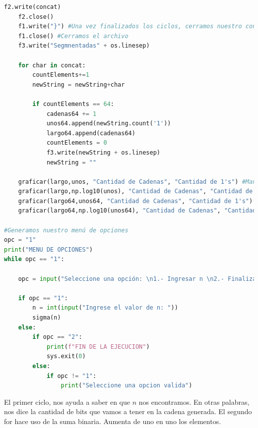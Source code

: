 \documentclass{article}
\begin{document}
\begin{lstlisting}[language=Python, caption=Implementación del Universo]
    f2.write(concat)
    f2.close()
    f1.write("}") #Una vez finalizados los ciclos, cerramos nuestro conjunto con una llave.
    f1.close() #Cerramos el archivo
    f3.write("Segmnentadas" + os.linesep)

    for char in concat:
        countElements+=1
        newString = newString+char
        
        if countElements == 64:
            cadenas64 += 1
            unos64.append(newString.count('1'))
            largo64.append(cadenas64)
            countElements = 0
            f3.write(newString + os.linesep)
            newString = ""

    graficar(largo,unos, "Cantidad de Cadenas", "Cantidad de 1's") #Mandamos llamar la función graficar, la cual nos muestra la cantidad de 1's en cada cadena, por lo cual le mandamos la variable largo y unos.
    graficar(largo,np.log10(unos), "Cantidad de Cadenas", "Cantidad de 1's (Log10)")
    graficar(largo64,unos64, "Cantidad de Cadenas", "Cantidad de 1's")
    graficar(largo64,np.log10(unos64), "Cantidad de Cadenas", "Cantidad de 1's (Log10)")

#Generamos nuestro menú de opciones
opc = "1"
print("MENU DE OPCIONES")
while opc == "1":
    
    opc = input("Seleccione una opción: \n1.- Ingresar n \n2.- Finalizar\n")
    
    if opc == "1":
        n = int(input("Ingrese el valor de n: "))
        sigma(n)
    else:
        if opc == "2":
            print(f"FIN DE LA EJECUCION")
            sys.exit(0)
        else:
            if opc != "1":
                print("Seleccione una opcion valida")


\end{lstlisting}
El primer ciclo, nos ayuda a saber en que $n$ nos encontramos. En otras palabras, nos dice la cantidad de bits que vamos a tener en la cadena generada. El segundo for hace uso de la suma binaria. Aumenta de uno en uno los elementos.
\newline\newline
\end{document}
